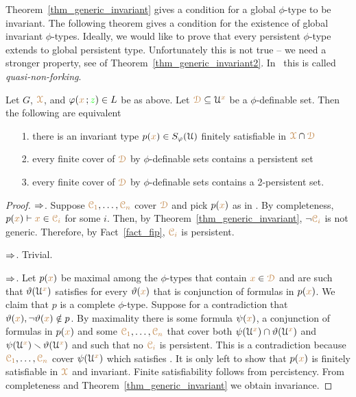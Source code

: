 Theorem~\ref{thm_generic_invariant} gives a condition for a global $\phi$-type to be invariant.
The following theorem gives a condition for the existence of global invariant $\phi$-types.
Ideally, we would like to prove that every persistent $\phi$-type extends to global persistent type.
Unfortunately this is not true -- we need a stronger property, see  of Theorem~\ref{thm_generic_invariant2}.
In~\cite{CK} this is called \textit{quasi-non-forking}.

\begin{theorem}\label{thm_generic_invariant2}
  Let $G$, ${\color{brown}\EuScript X}$, and $\varphi({\color{brown} x}\,;{\color{green} z})\in L$ be as above.
  Let ${\color{brown}\EuScript D}\subseteq\EuScript U^{\color{brown} x}$ be a $\phi$-definable set.
  Then the following are equivalent 
  \begin{itemize}
    \item[1.] there is an invariant type $p({\color{brown} x})\in S_\varphi(\EuScript U)$ finitely satisfiable in ${\color{brown}\EuScript X}\cap{\color{brown}\EuScript D}$
    \item[2.] every finite cover of ${\color{brown}\EuScript D}$ by $\phi$-definable sets contains a persistent set
    \item[3.] every finite cover of ${\color{brown}\EuScript D}$ by $\phi$-definable sets contains a 2-persistent set.
  \end{itemize}
\end{theorem}

\begin{proof}
  $\Rightarrow$.
  Suppose ${\color{brown}\EuScript C_1},\dots,{\color{brown}\EuScript C_n}$ cover ${\color{brown}\EuScript D}$ and pick $p({\color{brown} x})$ as in .
  By completeness, $p({\color{brown} x})\vdash {\color{brown}x}\in{\color{brown}\EuScript C_i}$ for some $i$.
  Then, by Theorem~\ref{thm_generic_invariant}, $\neg{\color{brown}\EuScript C_i}$ is not generic.
  Therefore, by Fact~\ref{fact_fip}, ${\color{brown}\EuScript C_i}$ is persistent.
  
  $\Rightarrow$.
  Trivial.

  $\Rightarrow$.
  Let $p({\color{brown} x})$ be maximal among the $\phi$-types that contain ${\color{brown} x}\in{\color{brown}\EuScript D}$ and are such that $\vartheta(\EuScript U^{\color{brown} x})$ satisfies  for every $\vartheta({\color{brown} x})$ that is conjunction of formulas in $p({\color{brown} x})$.
  We claim that $p$ is a complete $\phi$-type.
  Suppose for a contradiction that $\vartheta({\color{brown} x}),\neg\vartheta({\color{brown} x})\notin p$.
  By maximality there is some formula $\psi({\color{brown} x})$, a conjunction of formulas in $p({\color{brown} x})$ and some ${\color{brown}\EuScript C_1},\dots,{\color{brown}\EuScript C_n}$ that cover both $\psi(\EuScript U^{\color{brown} x})\cap\vartheta(\EuScript U^{\color{brown} x})$ and $\psi(\EuScript U^{\color{brown} x})\smallsetminus\vartheta(\EuScript U^{\color{brown} x})$ and such that no ${\color{brown}\EuScript C_i}$ is persistent.
  This is a contradiction because ${\color{brown}\EuScript C_1},\dots,{\color{brown}\EuScript C_n}$ cover $\psi(\EuScript U^{\color{brown} x})$ which satisfies .
  It is only left to show that $p({\color{brown} x})$ is finitely satisfiable in ${\color{brown}\EuScript X}$ and invariant.
  Finite satisfiability follows from percistency.
  From completeness and Theorem~\ref{thm_generic_invariant} we obtain invariance.
\end{proof}

